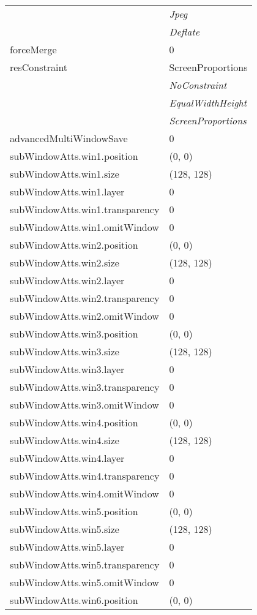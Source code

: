 \documentclass[10pt,a4paper]{report}
\begin{document}
\begin{longtable}{ll}
 & {\it  Jpeg} \\
 & {\it  Deflate} \\
forceMerge  &  0 \\
resConstraint  &  ScreenProportions   \\
 & {\it  NoConstraint} \\
 & {\it  EqualWidthHeight} \\
 & {\it  ScreenProportions} \\
advancedMultiWindowSave  &  0 \\
subWindowAtts.win1.position  &  (0, 0) \\
subWindowAtts.win1.size  &  (128, 128) \\
subWindowAtts.win1.layer  &  0 \\
subWindowAtts.win1.transparency  &  0 \\
subWindowAtts.win1.omitWindow  &  0 \\
subWindowAtts.win2.position  &  (0, 0) \\
subWindowAtts.win2.size  &  (128, 128) \\
subWindowAtts.win2.layer  &  0 \\
subWindowAtts.win2.transparency  &  0 \\
subWindowAtts.win2.omitWindow  &  0 \\
subWindowAtts.win3.position  &  (0, 0) \\
subWindowAtts.win3.size  &  (128, 128) \\
subWindowAtts.win3.layer  &  0 \\
subWindowAtts.win3.transparency  &  0 \\
subWindowAtts.win3.omitWindow  &  0 \\
subWindowAtts.win4.position  &  (0, 0) \\
subWindowAtts.win4.size  &  (128, 128) \\
subWindowAtts.win4.layer  &  0 \\
subWindowAtts.win4.transparency  &  0 \\
subWindowAtts.win4.omitWindow  &  0 \\
subWindowAtts.win5.position  &  (0, 0) \\
subWindowAtts.win5.size  &  (128, 128) \\
subWindowAtts.win5.layer  &  0 \\
subWindowAtts.win5.transparency  &  0 \\
subWindowAtts.win5.omitWindow  &  0 \\
subWindowAtts.win6.position  &  (0, 0) \\

\end{longtable}
\end{document}
